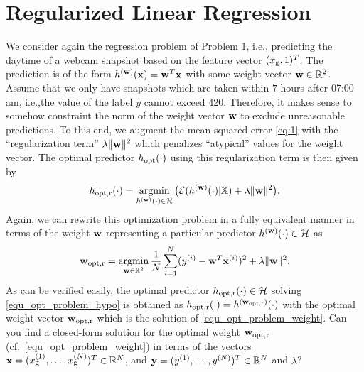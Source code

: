 \documentclass[article,11pt]{article}
\begin{document}
\newpage

\section{Regularized Linear Regression}
We consider again the regression problem of Problem 1, i.e., predicting the daytime of a webcam snapshot based on 
the feature vector $(x_{\rm g},1)^{T}$. The prediction is of the form $h^{({\bf w})}({\bf x}) = {\bf w}^{T} {\bf x}$ 
with some weight vector ${\bf w} \in \mathbb{R}^{2}$. Assume that we only have snapshots which are taken within $7$ hours after 07:00 am, i.e.,the 
value of the label $y$ cannot exceed $420$. Therefore, it makes sense to somehow constraint the norm of the weight vector ${\bf w}$ to 
exclude unreasonable predictions. To this end, we augment the mean squared error \eqref{eq:1} with the ``regularization term'' $\lambda \| {\bf w}\|^{2} $ 
which penalizes ``atypical'' values for the weight vector. The optimal predictor $h_{\rm opt}(\cdot)$ using this regularization term is then given by 
\begin{equation}
\label{equ_opt_problem_hypo_r}
h_{\rm opt,r}(\cdot)  = \argmin_{h^{(\mathbf{w})}(\cdot) \in \hypospace} \big(  \emperror(h^{(\mathbf{w})}(\cdot) | \dataset)+ \lambda \| \vw \|^{2} \big). 
\vspace*{-2mm}
\end{equation}
Again, we can rewrite this optimization problem in a fully equivalent manner in terms of the weight 
${\bf w}$ representing a particular predictor $h^{({\bf w})}(\cdot) \in \mathcal{H}$ as 
\vspace*{-5mm}
\begin{equation}
\label{equ_opt_problem_weight_r}
\vw_{\rm opt,r} = \argmin_{\vw \in \mathbb{R}^{2}}   \frac{1}{\samplesize}\sum^{\samplesize}_{\sampleidx=1}(y^{(\sampleidx)} - \vw^{T} \vx^{(\sampleidx)})^2 + \lambda \| \vw \|^{2}. 
\vspace{-3mm}
\end{equation}
As can be verified easily, the optimal predictor $h_{\rm opt,r}(\cdot) \in \mathcal{H}$ solving \eqref{equ_opt_problem_hypo} is obtained as 
$h_{\rm opt,r}(\cdot) = h^{({\bf w}_{\rm opt,r})}(\cdot)$ with the optimal weight vector ${\bf w}_{\rm opt,r}$ which is the solution of \eqref{equ_opt_problem_weight}.
Can you find a closed-form solution for the optimal weight ${\bf w}_{\rm opt,r}$ (cf.\ \eqref{equ_opt_problem_weight}) in terms of the vectors 
${\bf x} = (x_{\rm g}^{(1)},\ldots,x_{\rm g}^{(N)})^{T} \in \mathbb{R}^{N}$, and ${\bf y} = (y^{(1)}, \ldots,y^{(N)})^{T}\in \mathbb{R}^{N}$ and $\lambda$?
\end{document}

